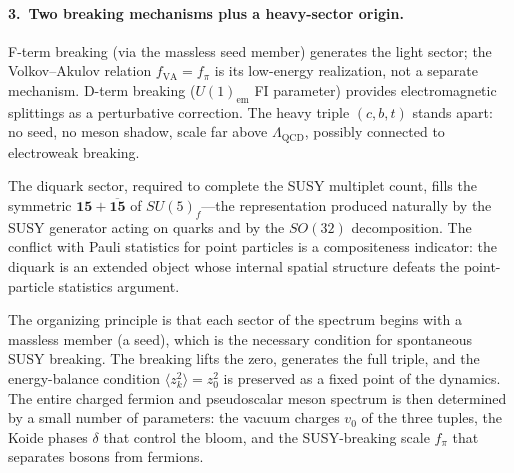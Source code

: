 \documentclass[12pt,a4paper]{article}
\begin{document}
\paragraph{3.\ Two breaking mechanisms plus a heavy-sector origin.}
F-term breaking (via the massless seed member) generates the light 
sector; the Volkov--Akulov relation $f_{\text{VA}} = f_\pi$ is its 
low-energy realization, not a separate mechanism. D-term breaking 
($U(1)_{\text{em}}$ FI parameter) provides electromagnetic 
splittings as a perturbative correction. The heavy triple 
$(c,b,t)$ stands apart: no seed, no meson shadow, scale far above 
$\Lambda_{\text{QCD}}$, possibly connected to electroweak breaking.

The diquark sector, required to complete the SUSY multiplet count, 
fills the symmetric $\mathbf{15} + \overline{\mathbf{15}}$ of 
$SU(5)_f$---the representation produced naturally by the SUSY 
generator acting on quarks and by the $SO(32)$ decomposition. The 
conflict with Pauli statistics for point particles is a 
compositeness indicator: the diquark is an extended object whose 
internal spatial structure defeats the point-particle statistics 
argument.

The organizing principle is that each sector of the spectrum begins 
with a massless member (a seed), which is the necessary condition 
for spontaneous SUSY breaking. The breaking lifts the zero, 
generates the full triple, and the energy-balance condition 
$\langle z_k^2\rangle = z_0^2$ is preserved as a fixed point 
of the dynamics. The entire charged fermion and pseudoscalar meson 
spectrum is then determined by a small number of parameters: the 
vacuum charges $v_0$ of the three tuples, the Koide phases 
$\delta$ that control the bloom, and the SUSY-breaking scale 
$f_\pi$ that separates bosons from fermions.
\end{document}
